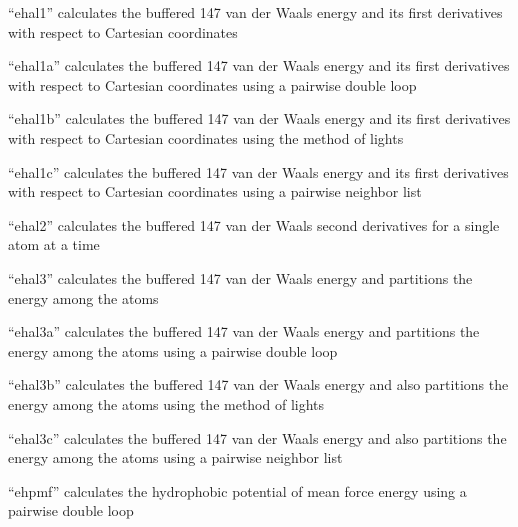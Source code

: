 \documentclass[letterpaper,11pt,english]{sphinxmanual}
\begin{document}

“ehal1” calculates the buffered 14\sphinxhyphen{}7 van der Waals energy and
its first derivatives with respect to Cartesian coordinates


“ehal1a” calculates the buffered 14\sphinxhyphen{}7 van der Waals energy and
its first derivatives with respect to Cartesian coordinates
using a pairwise double loop


“ehal1b” calculates the buffered 14\sphinxhyphen{}7 van der Waals energy and
its first derivatives with respect to Cartesian coordinates
using the method of lights


“ehal1c” calculates the buffered 14\sphinxhyphen{}7 van der Waals energy and
its first derivatives with respect to Cartesian coordinates
using a pairwise neighbor list


“ehal2” calculates the buffered 14\sphinxhyphen{}7 van der Waals second
derivatives for a single atom at a time


“ehal3” calculates the buffered 14\sphinxhyphen{}7 van der Waals energy
and partitions the energy among the atoms


“ehal3a” calculates the buffered 14\sphinxhyphen{}7 van der Waals energy
and partitions the energy among the atoms using a pairwise
double loop


“ehal3b” calculates the buffered 14\sphinxhyphen{}7 van der Waals energy
and also partitions the energy among the atoms using the
method of lights


“ehal3c” calculates the buffered 14\sphinxhyphen{}7 van der Waals energy
and also partitions the energy among the atoms using a
pairwise neighbor list


“ehpmf” calculates the hydrophobic potential of mean force
energy using a pairwise double loop

\end{document}
